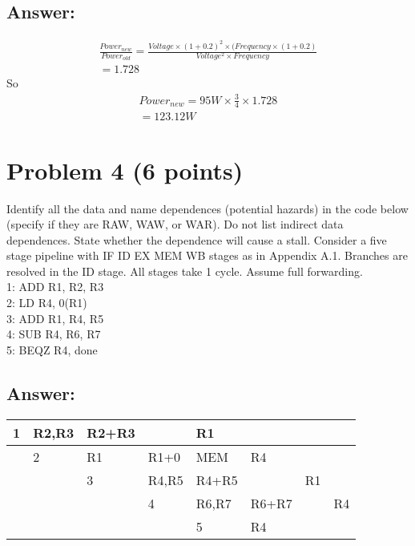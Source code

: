 \documentclass[letter,11pt,leqno]{article}
\begin{document}
\subsection*{Answer:}

\begin{eqnarray*}
  \frac{Power_{new}}{Power_{old}} = \frac{Voltage\times(1+0.2)^2\times(Frequency\times(1+0.2)}
       {Voltage^2\times{}Frequency}\\
       =1.728
\end{eqnarray*}
So
\begin{eqnarray*}
  Power_{new} = 95W\times\frac{3}{4}\times1.728\\
  =123.12W
\end{eqnarray*}

\section*{Problem 4 (6 points)}Identify all the data and name dependences (potential hazards) in the code below (specify if they are RAW, WAW, or WAR). Do not list indirect data dependences. State whether the dependence will cause a stall. Consider a five stage pipeline with IF ID EX MEM WB stages as in Appendix A.1. Branches are resolved in the ID stage. All stages take 1 cycle. Assume full forwarding.\\
1: ADD R1, R2, R3\\
2: LD R4, 0(R1)\\
3: ADD R1, R4, R5\\
4: SUB R4, R6, R7\\
5: BEQZ R4, done

\subsection*{Answer:}

\begin{tabular}{|l | l | l | l | l | l | l | l |}
  \hline
  1 & R2,R3 & R2+R3 &      & R1    &       &    &\\
  \hline
    & 2     & R1    & R1+0 & MEM   & R4    &    &\\
  \hline
    &       & 3     & R4,R5& R4+R5 &       & R1 &\\
  \hline
    &       &       & 4    & R6,R7 & R6+R7 &    & R4\\
  \hline
    &       &       &      & 5     & R4    &    &\\
  \hline
\end{tabular}
\end{document}
